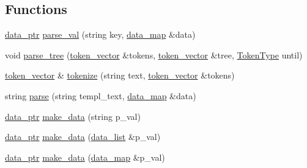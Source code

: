 \subsection*{Functions}
\begin{DoxyCompactItemize}
\item 
\hyperlink{namespacextd_1_1network_1_1http_1_1cpptempl_ad2f49991f1902699a98cf62bf0ae7ce6}{data\-\_\-ptr} \hyperlink{namespacextd_1_1network_1_1http_1_1cpptempl_af79d10d06cd5bc9ce629bb2d21fbcfd6}{parse\-\_\-val} (string key, \hyperlink{namespacextd_1_1network_1_1http_1_1cpptempl_a638d1d81c8fb63c0bbafd508d6a2a007}{data\-\_\-map} \&data)
\item 
void \hyperlink{namespacextd_1_1network_1_1http_1_1cpptempl_a27515db5dde2876849fa316963a67e63}{parse\-\_\-tree} (\hyperlink{namespacextd_1_1network_1_1http_1_1cpptempl_a38606cfbbfe81ed46ea9b0cf064de956}{token\-\_\-vector} \&tokens, \hyperlink{namespacextd_1_1network_1_1http_1_1cpptempl_a38606cfbbfe81ed46ea9b0cf064de956}{token\-\_\-vector} \&tree, \hyperlink{namespacextd_1_1network_1_1http_1_1cpptempl_a39833083d228a5b5ef9f6bb7896479ee}{Token\-Type} until)
\item 
\hyperlink{namespacextd_1_1network_1_1http_1_1cpptempl_a38606cfbbfe81ed46ea9b0cf064de956}{token\-\_\-vector} \& \hyperlink{namespacextd_1_1network_1_1http_1_1cpptempl_ab8c502f7e8347124c43f3dab3a583b34}{tokenize} (string text, \hyperlink{namespacextd_1_1network_1_1http_1_1cpptempl_a38606cfbbfe81ed46ea9b0cf064de956}{token\-\_\-vector} \&tokens)
\item 
string \hyperlink{namespacextd_1_1network_1_1http_1_1cpptempl_a10e259ee95bf5effff9095cdd140a058}{parse} (string templ\-\_\-text, \hyperlink{namespacextd_1_1network_1_1http_1_1cpptempl_a638d1d81c8fb63c0bbafd508d6a2a007}{data\-\_\-map} \&data)
\item 
\hyperlink{namespacextd_1_1network_1_1http_1_1cpptempl_ad2f49991f1902699a98cf62bf0ae7ce6}{data\-\_\-ptr} \hyperlink{namespacextd_1_1network_1_1http_1_1cpptempl_a32fe5ec0914372b09492647a168dbbcb}{make\-\_\-data} (string p\-\_\-val)
\item 
\hyperlink{namespacextd_1_1network_1_1http_1_1cpptempl_ad2f49991f1902699a98cf62bf0ae7ce6}{data\-\_\-ptr} \hyperlink{namespacextd_1_1network_1_1http_1_1cpptempl_aae0780ff5e5b2afd5996fb6d27ff8ca0}{make\-\_\-data} (\hyperlink{namespacextd_1_1network_1_1http_1_1cpptempl_aff1b51bcf8064f69c85dd4833c1853b4}{data\-\_\-list} \&p\-\_\-val)
\item 
\hyperlink{namespacextd_1_1network_1_1http_1_1cpptempl_ad2f49991f1902699a98cf62bf0ae7ce6}{data\-\_\-ptr} \hyperlink{namespacextd_1_1network_1_1http_1_1cpptempl_a4574c7173346efa3cfa420e5c657b58d}{make\-\_\-data} (\hyperlink{namespacextd_1_1network_1_1http_1_1cpptempl_a638d1d81c8fb63c0bbafd508d6a2a007}{data\-\_\-map} \&p\-\_\-val)

\end{DoxyCompactItemize}
